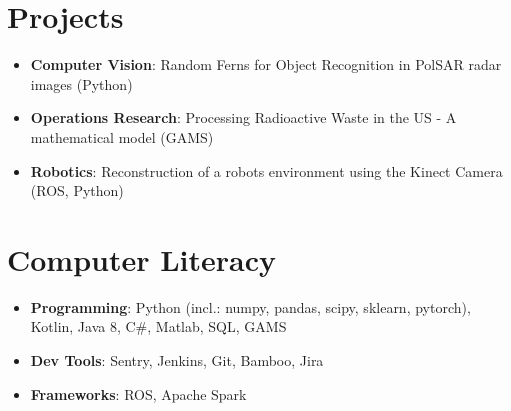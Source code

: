 \documentclass[letterpaper,11pt]{article}
\newcommand{\resumeSubHeadingListStart}{\begin{itemize}[leftmargin=*]}
\newcommand{\resumeSubHeadingListEnd}{\end{itemize}}
\begin{document}
\section{Projects}
  \resumeSubHeadingListStart
  	\item{\textbf{Computer Vision}: Random Ferns for Object Recognition in PolSAR radar images (Python)}
  	\vspace{-0.1in}
    \item{\textbf{Operations Research}: Processing Radioactive Waste in the US - A mathematical model (GAMS)}   
    \vspace{-0.1in} 	
	\item{\textbf{Robotics}: Reconstruction of a robots environment using the Kinect Camera (ROS, Python)}
	\vspace{-0.1in}
\resumeSubHeadingListEnd

\section{Computer Literacy}
\resumeSubHeadingListStart
\item{\textbf{Programming}: Python (incl.: numpy, pandas, scipy, sklearn, pytorch), Kotlin, Java 8, C\#, Matlab, SQL, GAMS}
\vspace{-0.1in}
\item{\textbf{Dev Tools}: Sentry, Jenkins, Git, Bamboo, Jira}   
\vspace{-0.1in}
\item{\textbf{Frameworks}: ROS, Apache Spark}   
\vspace{-0.1in}
\resumeSubHeadingListEnd
\end{document}
